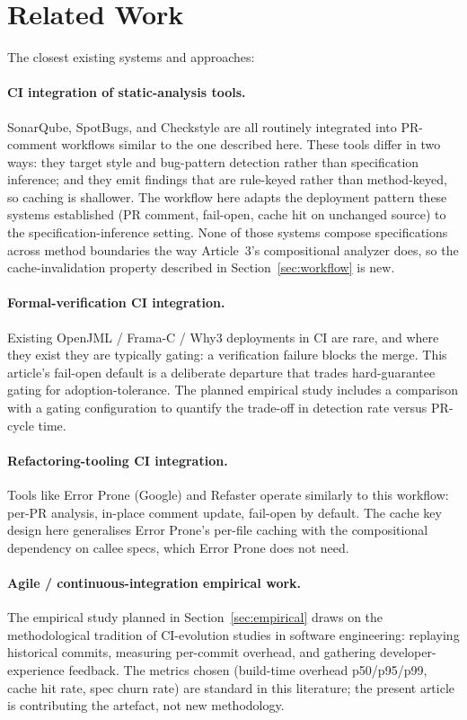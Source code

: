 \section{Related Work}
\label{sec:related}

The closest existing systems and approaches:

\paragraph{CI integration of static-analysis tools.} SonarQube, SpotBugs, and Checkstyle are all routinely integrated into PR-comment workflows similar to the one described here. These tools differ in two ways: they target style and bug-pattern detection rather than specification inference; and they emit findings that are rule-keyed rather than method-keyed, so caching is shallower. The workflow here adapts the deployment pattern these systems established (PR comment, fail-open, cache hit on unchanged source) to the specification-inference setting. None of those systems compose specifications across method boundaries the way Article~3's compositional analyzer does, so the cache-invalidation property described in Section~\ref{sec:workflow} is new.

\paragraph{Formal-verification CI integration.} Existing OpenJML / Frama-C / Why3 deployments in CI are rare, and where they exist they are typically gating: a verification failure blocks the merge. This article's fail-open default is a deliberate departure that trades hard-guarantee gating for adoption-tolerance. The planned empirical study includes a comparison with a gating configuration to quantify the trade-off in detection rate versus PR-cycle time.

\paragraph{Refactoring-tooling CI integration.} Tools like Error Prone (Google) and Refaster operate similarly to this workflow: per-PR analysis, in-place comment update, fail-open by default. The cache key design here generalises Error Prone's per-file caching with the compositional dependency on callee specs, which Error Prone does not need.

\paragraph{Agile / continuous-integration empirical work.} The empirical study planned in Section~\ref{sec:empirical} draws on the methodological tradition of CI-evolution studies in software engineering: replaying historical commits, measuring per-commit overhead, and gathering developer-experience feedback. The metrics chosen (build-time overhead p50/p95/p99, cache hit rate, spec churn rate) are standard in this literature; the present article is contributing the artefact, not new methodology.
